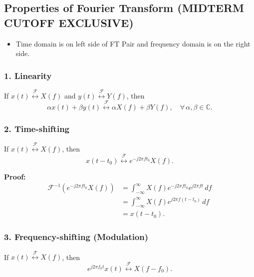 \subsection{Properties of Fourier Transform (MIDTERM CUTOFF EXCLUSIVE)}
\begin{warning}
    \begin{itemize}
        \item Time domain is on left side of FT Pair and frequency domain is on the right side.
    \end{itemize}
\end{warning}

\subsubsection{1. Linearity}
\begin{definition}
    If \( x(t) \overset{\mathcal{F}}{\leftrightarrow} X(f) \) and \( y(t) \overset{\mathcal{F}}{\leftrightarrow} Y(f) \), then
\[
\alpha x(t) + \beta y(t) \overset{\mathcal{F}}{\leftrightarrow} \alpha X(f) + \beta Y(f), \quad \forall \, \alpha, \beta \in \mathbb{C}.
\]
\end{definition}

\subsubsection{2. Time-shifting}
\begin{definition}
    If \( x(t) \overset{\mathcal{F}}{\leftrightarrow} X(f) \), then
\[
x(t - t_0) \overset{\mathcal{F}}{\leftrightarrow} e^{-j 2 \pi f t_0} X(f).
\]
\end{definition}

\begin{derivation}
    \textbf{Proof:}
    \begin{align*}
    \mathcal{F}^{-1} \left( e^{-j 2 \pi f t_0} X(f) \right) &= \int_{-\infty}^{\infty} X(f) e^{-j 2 \pi f t_0} e^{j 2 \pi f t} \, df \\
    &= \int_{-\infty}^{\infty} X(f) e^{j 2 \pi f (t - t_0)} \, df \\
    &= x(t - t_0).
    \end{align*}
\end{derivation}

\subsubsection{3. Frequency-shifting (Modulation)}
\begin{definition}
    If \( x(t) \overset{\mathcal{F}}{\leftrightarrow} X(f) \), then
    \[
    e^{j 2 \pi f_0 t} x(t) \overset{\mathcal{F}}{\leftrightarrow} X(f - f_0).
    \]
\end{definition}

